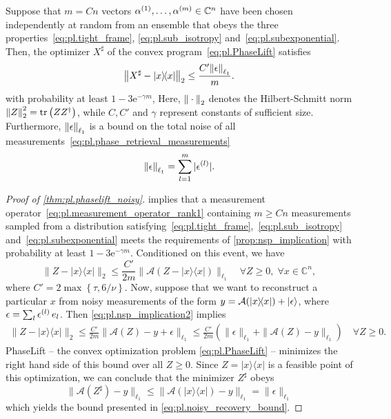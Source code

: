 \begin{theorem}%
  \label{thm:pl.phaselift_noisy}
  Suppose that $m = Cn$ vectors $\alpha^{(1)},\ldots,\alpha^{(m)} \in \mathbb{C}^n$ have been chosen independently at random from an ensemble that obeys the three properties~\eqref{eq:pl.tight_frame}, \eqref{eq:pl.sub_isotropy} and~\eqref{eq:pl.subexponential}.
  Then, the optimizer $X^\sharp$ of the convex program~\eqref{eq:pl.PhaseLift} satisfies
  \[
    \Fnorm{{X}^\sharp - \ketbra{x}} \leq \frac{C'  \norm{\epsilon}_{\ell_1}}{m}.
    \label{eq:pl.noisy_recovery_bound}
  \]
  with probability at least $1 - 3\mathrm{e}^{-\gamma m}$,
  Here, ${\Vert\cdot\Vert}_{2}$ denotes the Hilbert-Schmitt norm ${\Vert Z\Vert}_{2}^2 = \operatorname{tr} \left( {Z} {Z}^\dagger \right)$, while $C,C'$ and $\gamma$ represent constants of sufficient size.
  Furthermore, ${\Vert\epsilon\Vert}_{\ell_1}$ is a bound on the total noise of all measurements~\eqref{eq:pl.phase_retrieval_measurements}
  \[
    {\Vert\epsilon\Vert}_{\ell_1} = \sum_{l=1}^m {\vert\epsilon^{(l)}\vert}.
    \label{eq:pl.phaselift_noisy.noise_bound}
  \]
\end{theorem}

\begin{proof}[Proof of \cref{thm:pl.phaselift_noisy}]
   implies that a measurement operator~\eqref{eq:pl.measurement_operator_rank1} containing $m \geq C n$ measurements sampled from a distribution satisfying~\eqref{eq:pl.tight_frame},~\eqref{eq:pl.sub_isotropy} and~\eqref{eq:pl.subexponential} meets the requirements of \cref{prop:nsp_implication} with probability at least $1-3 \mathrm{e}^{-\gamma m}$.
  Conditioned on this event, we have
  \[
  \|  Z - |{x} \rangle \! \langle {x}| \|_2 \leq \frac{C'}{2m}  \| \mathcal{A}( Z - |{x} \rangle \! \langle {x}|) \|_{\ell_1} \quad \forall  Z \geq 0,\; \forall {x} \in \mathbb{C}^n,
  \label{eq:pl.nsp_implication2}
  \]
  where $C' = 2 \max \left\{\tau, 6/\nu \right\}$.
  Now, suppose that we want to reconstruct a particular ${x}$ from noisy measurements of the form ${y} = \mathcal{A} (|{x} \rangle \! \langle {x}|) + \ket{\epsilon}$, where ${\epsilon} = \sum_l \epsilon^{(l)} \, {e_l}$.
  Then \cref{eq:pl.nsp_implication2} implies
  \begin{align}
    \|  Z - |{x} \rangle \! \langle {x}| \|_2 \leq \frac{C'}{2m} \| \mathcal{A}( Z) - {y} + {\epsilon} \|_{\ell_1}
    \leq \frac{C'}{2m} \left( \| {\epsilon} \|_{\ell_1} + \| \mathcal{A}( Z) - {y} \|_{\ell_1} \right)\quad \forall  Z \geq 0.
    \label{eq:pl.phaselift_noisy.final_bound}
  \end{align}
  PhaseLift -- the convex optimization problem \eqref{eq:pl.PhaseLift} -- minimizes the right hand side of this bound over all $ Z \geq 0$.
  Since $ Z = |{x} \rangle \! \langle {x}|$ is a feasible point of this optimization, we can conclude that the minimizer $ Z^\sharp$ obeys
  \[
    \| \mathcal{A}( Z^\sharp) - {y} \|_{\ell_1} \leq \| \mathcal{A}(|{x} \rangle \! \langle {x}|)-{y} \|_{\ell_1} = \| {\epsilon} \|_{\ell_1}
  \]
  which yields the bound presented in \cref{eq:pl.noisy_recovery_bound}.
\end{proof}

